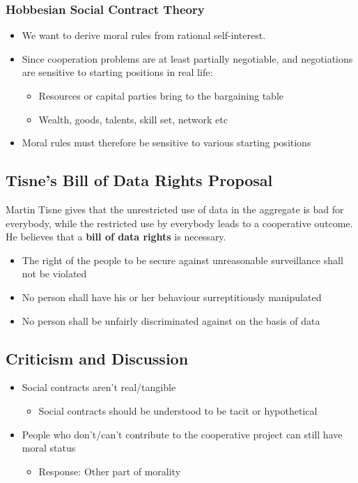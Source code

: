 \documentclass{article}
\begin{document}
            \subsubsection{Hobbesian Social Contract Theory}
            \begin{itemize}
                \item We want to derive moral rules from rational self-interest. 
                \item Since cooperation problems are at least partially negotiable, and negotiations are sensitive to starting positions in real life:
                \begin{itemize}
                    \item Resources or capital parties bring to the bargaining table
                    \item Wealth, goods, talents, skill set, network etc
                \end{itemize}
                \item Moral rules must therefore be sensitive to various starting positions
            \end{itemize}
            
        \subsection{Tisne's Bill of Data Rights Proposal}
        Martin Tisne gives that the unrestricted use of data in the aggregate is bad for everybody, while the restricted use by everybody leads to a cooperative outcome. He believes that a \textbf{bill of data rights} is necessary.
        \begin{itemize}
            \item The right of the people to be secure against unreasonable surveillance shall not be violated
            \item No person shall have his or her behaviour surreptitiously manipulated
            \item No person shall be unfairly discriminated against on the basis of data
        \end{itemize}
        
        \subsection{Criticism and Discussion}
        \begin{itemize}
            \item Social contracts aren't real/tangible
            \begin{itemize}
                \item Social contracts should be understood to be tacit or hypothetical
            \end{itemize}
            \item People who don't/can't contribute to the cooperative project can still have moral status
            \begin{itemize}
                \item Response: Other part of morality %
            \end{itemize}{}
        \end{itemize}
\end{document}
